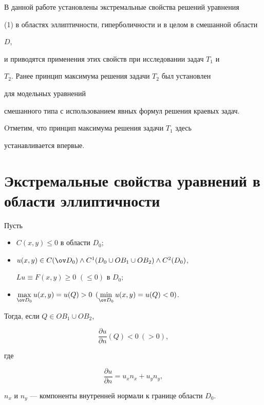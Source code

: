 В данной работе установлены экстремальные свойства решений уравнения 


(1) в областях эллиптичности, гиперболичности и в целом в смешанной области


$D$,


и приводятся применения этих свойств при исследовании задач $T_1$ и 


$T_2$. Ранее принцип максимума решения задачи $T_2$ был установлен


для модельных уравнений 


смешанного типа с использованием явных формул решения краевых задач.


Oтметим, что принцип максимума решения задачи $T_1$ здесь


устанавливается впервые.





\section{Экстремальные свойства уравнений в области эллиптичности}





\begin{thm}


Пусть


\begin{itemize}


\item[1)] $C(x,y)\le 0$ в области $D_0;$


\item[2)] 


$u(x,y)\in C(\ov D_0)\land C^1(D_0\cup OB_1\cup OB_2)\land C^2(D_0)$,


$Lu\equiv F(x,y)\ge 0$ $(\le 0)$ в $D_0;$


\item[3)] $\max \limits_{\ov


D_0} u(x,y)=u(Q)>0$ $(\min \limits_{\ov D_0}u(x,y)=u(Q)<0)$.


\end{itemize}


Тогда, если $Q\in OB_1\cup OB_2$,


\begin{equation}


\frac {\partial u}{\partial n}(Q)<0\ (>0),


\end{equation} 


где


$$


\frac {\partial u}{\partial n}=u_xn_x+u_yn_y,


$$


$n_x$ и $n_y$ --- компоненты внутренней нормали к границе области $D_0$.


\end{thm}






